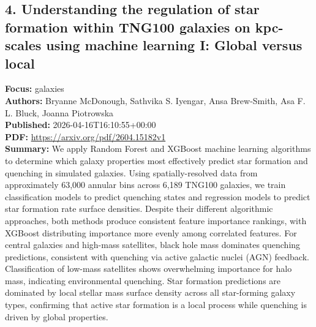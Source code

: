 \documentclass[11pt]{article}
\begin{document}
\subsection*{4. Understanding the regulation of star formation within TNG100 galaxies on kpc-scales using machine learning I: Global versus local}
\textbf{Focus:} galaxies\\
\textbf{Authors:} Bryanne McDonough, Sathvika S. Iyengar, Ansa Brew-Smith, Asa F. L. Bluck, Joanna Piotrowska\\
\textbf{Published:} 2026-04-16T16:10:55+00:00\\
\textbf{PDF:} \href{https://arxiv.org/pdf/2604.15182v1}{https://arxiv.org/pdf/2604.15182v1}\\
\textbf{Summary:}
We apply Random Forest and XGBoost machine learning algorithms to determine which galaxy properties most effectively predict star formation and quenching in simulated galaxies. Using spatially-resolved data from approximately 63,000 annular bins across 6,189 TNG100 galaxies, we train classification models to predict quenching states and regression models to predict star formation rate surface densities. Despite their different algorithmic approaches, both methods produce consistent feature importance rankings, with XGBoost distributing importance more evenly among correlated features. For central galaxies and high-mass satellites, black hole mass dominates quenching predictions, consistent with quenching via active galactic nuclei (AGN) feedback. Classification of low-mass satellites shows overwhelming importance for halo mass, indicating environmental quenching. Star formation predictions are dominated by local stellar mass surface density across all star-forming galaxy types, confirming that active star formation is a local process while quenching is driven by global properties.
\newpage
\end{document}
